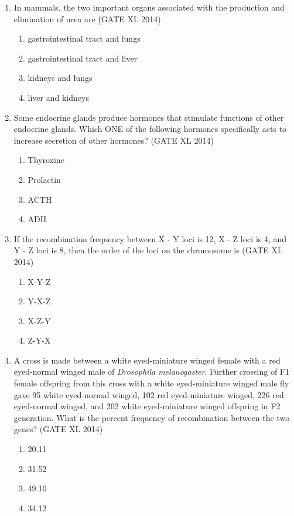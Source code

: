 \documentclass[journal,12pt,onecolumn]{IEEEtran}
\theoremstyle{remark}
\begin{document}
\begin{enumerate}
\item In mammals, the two important organs associated with the production and elimination of urea are \hfill(GATE XL 2014)\\
\begin{multicols}{2}
\begin{enumerate}
\item gastrointestinal tract and lungs
\item gastrointestinal tract and liver
\item kidneys and lungs
\item liver and kidneys
\end{enumerate}
\end{multicols}

\item Some endocrine glands produce hormones that stimulate functions of other endocrine glands. Which ONE of the following hormones specifically acts to increase secretion of other hormones? \hfill(GATE XL 2014)\\
\begin{multicols}{2}
\begin{enumerate}
\item Thyroxine
\item Prolactin
\item ACTH
\item ADH
\end{enumerate}
\end{multicols}

\item If the recombination frequency between X - Y loci is 12, X - Z loci is 4, and Y - Z loci is 8, then the order of the loci on the chromosome is \hfill(GATE XL 2014)\\
\begin{multicols}{2}
\begin{enumerate}
\item X-Y-Z
\item Y-X-Z
\item X-Z-Y
\item Z-Y-X
\end{enumerate}
\end{multicols}

\item A cross is made between a white eyed-miniature winged female with a red eyed-normal winged male of \textit{Drosophila melanogaster}. Further crossing of F1 female offspring from this cross with a white eyed-miniature winged male fly gave 95 white eyed-normal winged, 102 red eyed-miniature winged, 226 red eyed-normal winged, and 202 white eyed-miniature winged offspring in F2 generation. What is the percent frequency of recombination between the two genes? \hfill(GATE XL 2014)\\
\begin{multicols}{2}
\begin{enumerate}
\item 20.11
\item 31.52
\item 49.10
\item 34.12
\end{enumerate}
\end{multicols}


\end{enumerate}
\end{document}
